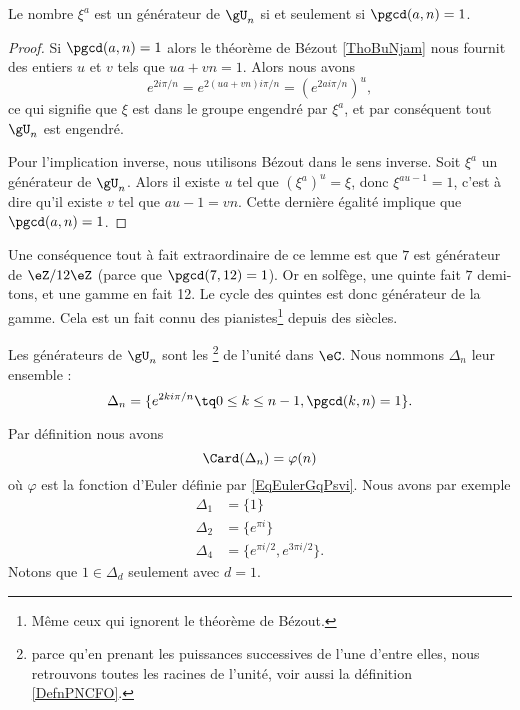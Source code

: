 \begin{lemma}   \label{LemcFTNMa}
    Le nombre \( \xi^a\) est un générateur de \( \gU_n\) si et seulement si \( \pgcd(a,n)=1\).
\end{lemma}

\begin{proof}
    Si \( \pgcd(a,n)=1\) alors le théorème de Bézout \ref{ThoBuNjam} nous fournit des entiers \( u\) et \( v\) tels que \( ua+vn=1\). Alors nous avons
    \begin{equation}
        e^{2i\pi /n}= e^{2(ua+vn)i\pi/n}=( e^{2ai\pi/n})^u,
    \end{equation}
    ce qui signifie que \( \xi\) est dans le groupe engendré par \( \xi^a\), et par conséquent tout \( \gU_n\) est engendré.

    Pour l'implication inverse, nous utilisons Bézout dans le sens inverse. Soit \( \xi^a\) un générateur de \( \gU_n\). Alors il existe \( u\) tel que \( (\xi^a)^u=\xi\), donc \( \xi^{au-1}=1\), c'est à dire qu'il existe \( v\) tel que \( au-1=vn\). Cette dernière égalité implique que \( \pgcd(a,n)=1\).
\end{proof}

\begin{example}
Une conséquence tout à fait extraordinaire de ce lemme est que \( 7\) est générateur de \( \eZ/12\eZ\) (parce que \( \pgcd(7,12)=1\)). Or en solfège, une quinte fait \( 7\) demi-tons, et une gamme en fait 12. Le cycle des quintes est donc générateur de la gamme\cite{YDXsAM}. Cela est un fait connu des pianistes\footnote{Même ceux qui ignorent le théorème de Bézout.} depuis des siècles.
\end{example}

\begin{definition}\label{DefLYGTooFPOYGZ}
    Les générateurs de \( \gU_n\) sont les \footnote{parce qu'en prenant les puissances successives de l'une d'entre elles, nous retrouvons toutes les racines de l'unité, voir aussi la définition \ref{DefnPNCFO}.} de l'unité dans \( \eC\). Nous nommons \( \Delta_n\) leur ensemble :
\begin{equation}
    \Delta_n=\{  e^{2ki\pi/n}\tq 0\leq k\leq n-1,\pgcd(k,n)=1 \}.
\end{equation}
\end{definition}

Par définition nous avons
\begin{equation}
    \Card(\Delta_n)=\varphi(n)
\end{equation}
où \( \varphi\) est la fonction d'Euler définie par \eqref{EqEulerGqPsvi}. Nous avons par exemple
\begin{subequations}
    \begin{align}
        \Delta_1&=\{ 1 \}\\
        \Delta_2&=\{  e^{\pi i} \}\\
        \Delta_4&=\{  e^{\pi i/2}, e^{3\pi i/2} \}.
    \end{align}
\end{subequations}
Notons que \( 1\in \Delta_d\) seulement avec \( d=1\).

